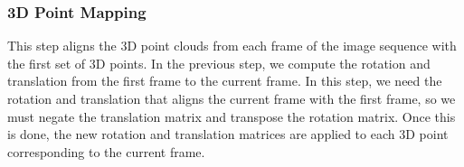 \subsubsection{3D Point Mapping}
	This step aligns the 3D point clouds from each frame of the image sequence with the first set of 3D points. In the previous step, we compute the rotation and translation from the first frame to the current frame. In this step, we need the rotation and translation that aligns the current frame with the first frame, so we must negate the translation matrix and transpose the rotation matrix. Once this is done, the new rotation and translation matrices are applied to each 3D point corresponding to the current frame.











